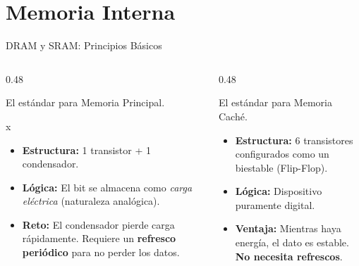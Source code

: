 \documentclass[table, aspectratio=169]{beamer}
\begin{document}
\section{Memoria Interna}
\label{sec:org3533016}
\begin{frame}[label={sec:orgb086438}]{DRAM y SRAM: Principios Básicos}
\begin{columns}[T]
  \begin{column}{0.48\textwidth}
    \begin{conceptobox}
      El estándar para Memoria Principal.
    \end{conceptobox}x
    \begin{itemize}
      \item \textbf{Estructura:} 1 transistor + 1 condensador.
      \item \textbf{Lógica:} El bit se almacena como \textit{carga eléctrica} (naturaleza analógica).
      \item \textbf{Reto:} El condensador pierde carga rápidamente. Requiere un \textcolor{WarnColor}{\textbf{refresco periódico}} para no perder los datos.
    \end{itemize}
  \end{column}
  
  \begin{column}{0.48\textwidth}
    \begin{conceptotemporal}
      El estándar para Memoria Caché.
    \end{conceptotemporal}
    \begin{itemize}
      \item \textbf{Estructura:} 6 transistores configurados como un biestable (Flip-Flop).
      \item \textbf{Lógica:} Dispositivo puramente digital.
      \item \textbf{Ventaja:} Mientras haya energía, el dato es estable. \textcolor{HitGreen}{\textbf{No necesita refrescos}}.
    \end{itemize}
  \end{column}
\end{columns}
\end{frame}
\end{document}
